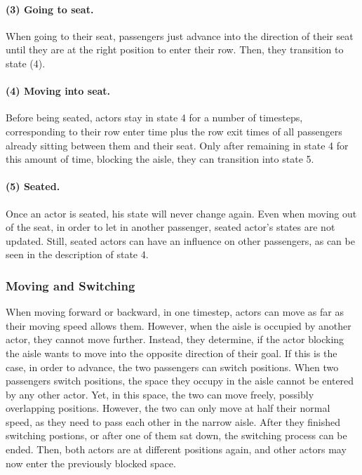 \documentclass[11pt]{article}
\begin{document}
\paragraph{(3) Going to seat.}
When going to their seat, passengers just advance into the direction of their seat until they are at the right position to enter their row. Then, they transition to state (4).


\paragraph{(4) Moving into seat.}
Before being seated, actors stay in state 4 for a number of timesteps, corresponding to their row enter time plus the row exit times of all passengers already sitting between them and their seat. Only after remaining in state 4 for this amount of time, blocking the aisle, they can transition into state 5.

\paragraph{(5) Seated.}
Once an actor is seated, his state will never change again. Even when moving out of the seat, in order to let in another passenger, seated actor's states are not updated. Still, seated actors can have an influence on other passengers, as can be seen in the description of state 4.


\subsubsection{Moving and Switching}
When moving forward or backward, in one timestep, actors can move as far as their moving speed allows them. However, when the aisle is occupied by another actor, they cannot move further. Instead, they determine, if the actor blocking the aisle wants to move into the opposite direction of their goal. If this is the case, in order to advance, the two passengers can switch positions. When two passengers switch positions, the space they occupy in the aisle cannot be entered by any other actor. Yet, in this space, the two can move freely, possibly overlapping positions. However, the two can only move at half their normal speed, as they need to pass each other in the narrow aisle. After they finished switching postions, or after one of them sat down, the switching process can be ended. Then, both actors are at different positions again, and other actors may now enter the previously blocked space.
\end{document}
